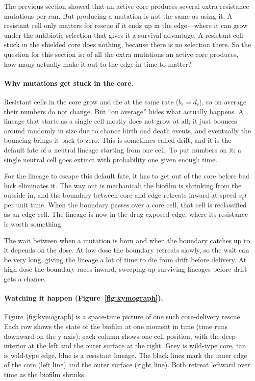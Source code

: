 \documentclass[11pt]{article}
\begin{document}
The previous section showed that an active core produces several
extra resistance mutations per run. But producing a mutation is not
the same as using it. A resistant cell only matters for rescue if it
ends up in the edge---where it can grow under the antibiotic
selection that gives it a survival advantage. A resistant cell stuck
in the shielded core does nothing, because there is no selection
there. So the question for this section is: of all the extra
mutations an active core produces, how many actually make it out to
the edge in time to matter?

\paragraph{Why mutations get stuck in the core.}
Resistant cells in the core grow and die at the same rate
($b_c = d_c$), so on average their numbers do not change. But ``on
average'' hides what actually happens. A lineage that starts as a
single cell mostly does not grow at all; it just bounces around
randomly in size due to chance birth and death events, and eventually
the bouncing brings it back to zero. This is sometimes called drift,
and it is the default fate of a neutral lineage starting from one
cell. To put numbers on it: a single neutral cell goes extinct with
probability one given enough time.

For the lineage to escape this default fate, it has to get out of the
core before bad luck eliminates it. The way out is mechanical: the
biofilm is shrinking from the outside in, and the boundary between
core and edge retreats inward at speed $s_e l$ per unit time. When
the boundary passes over a core cell, that cell is reclassified as an
edge cell. The lineage is now in the drug-exposed edge, where its
resistance is worth something.

The wait between when a mutation is born and when the boundary
catches up to it depends on the dose. At low dose the boundary
retreats slowly, so the wait can be very long, giving the lineage a
lot of time to die from drift before delivery. At high dose the
boundary races inward, sweeping up surviving lineages before drift
gets a chance.

\paragraph{Watching it happen (Figure~\ref{fig:kymograph}).}
Figure~\ref{fig:kymograph} is a space-time picture of one such
core-delivery rescue. Each row shows the state of the biofilm at one
moment in time (time runs downward on the y-axis); each column shows
one cell position, with the deep interior at the left and the outer
surface at the right. Grey is wild-type core, tan is wild-type edge,
blue is a resistant lineage. The black lines mark the inner edge
of the core (left line) and the outer surface (right line). Both
retreat leftward over time as the biofilm shrinks.
\end{document}
